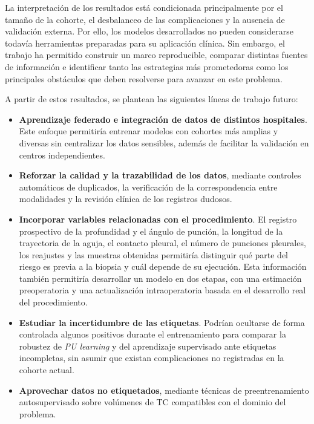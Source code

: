 La interpretación de los resultados está condicionada principalmente por el tamaño de la cohorte, el desbalanceo de las complicaciones y la ausencia de validación externa. Por ello, los modelos desarrollados no pueden considerarse todavía herramientas preparadas para su aplicación clínica. Sin embargo, el trabajo ha permitido construir un marco reproducible, comparar distintas fuentes de información e identificar tanto las estrategias más prometedoras como los principales obstáculos que deben resolverse para avanzar en este problema.

A partir de estos resultados, se plantean las siguientes líneas de trabajo futuro:

\begin{itemize}

    \item \textbf{Aprendizaje federado e integración de datos de distintos hospitales}. Este enfoque permitiría entrenar modelos con cohortes más amplias y diversas sin centralizar los datos sensibles, además de facilitar la validación en centros independientes.

    \item \textbf{Reforzar la calidad y la trazabilidad de los datos}, mediante controles automáticos de duplicados, la verificación de la correspondencia entre modalidades y la revisión clínica de los registros dudosos.

    \item \textbf{Incorporar variables relacionadas con el procedimiento}. El registro prospectivo de la profundidad y el ángulo de punción, la longitud de la trayectoria de la aguja, el contacto pleural, el número de punciones pleurales, los reajustes y las muestras obtenidas permitiría distinguir qué parte del riesgo es previa a la biopsia y cuál depende de su ejecución. Esta información también permitiría desarrollar un modelo en dos etapas, con una estimación preoperatoria y una actualización intraoperatoria basada en el desarrollo real del procedimiento.

    \item \textbf{Estudiar la incertidumbre de las etiquetas}. Podrían ocultarse de forma controlada algunos positivos durante el entrenamiento para comparar la robustez de \textit{PU learning} y del aprendizaje supervisado ante etiquetas incompletas, sin asumir que existan complicaciones no registradas en la cohorte actual.

    \item \textbf{Aprovechar datos no etiquetados}, mediante técnicas de preentrenamiento autosupervisado sobre volúmenes de TC compatibles con el dominio del problema.


\end{itemize}
